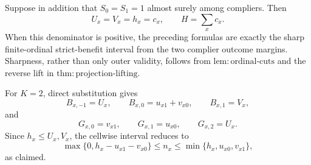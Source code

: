 Suppose in addition that \(S_0=S_1=1\) almost surely among compliers. Then
\[
 U_x=V_x=h_x=c_x,
 \qquad H=\sum_xc_x.
\]
When this denominator is positive, the preceding formulas are exactly the sharp finite-ordinal strict-benefit interval from the two complier outcome margins. Sharpness, rather than only outer validity, follows from \(\mathrm{lem:ordinal\text{-}cuts}\) and the reverse lift in \(\mathrm{thm:projection\text{-}lifting}\).

For \(K=2\), direct substitution gives
\[
 B_{x,-1}=U_x,
 \qquad B_{x,0}=u_{x1}+v_{x0},
 \qquad B_{x,1}=V_x,
\]
and
\[
 G_{x,0}=v_{x1},
 \qquad G_{x,1}=u_{x0},
 \qquad G_{x,2}=U_x.
\]
Since \(h_x\leq U_x,V_x\), the cellwise interval reduces to
\[
 \max\{0,h_x-u_{x1}-v_{x0}\}
 \leq n_x\leq
 \min\{h_x,u_{x0},v_{x1}\},
\]
as claimed.
